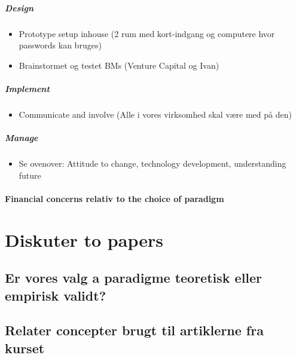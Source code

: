 \documentclass[a4paper]{article}
\begin{document}
\subparagraph{Design}
\begin{itemize}
\item Prototype setup inhouse (2 rum med kort-indgang og computere hvor passwords kan bruges)
\item Brainstormet og testet BMs (Venture Capital og Ivan)
\end{itemize}

\subparagraph{Implement}
\begin{itemize}
  \item Communicate and involve (Alle i vores virksomhed skal være med på den)
\end{itemize}

\subparagraph{Manage}
\begin{itemize}
  \item Se ovenover: Attitude to change, technology development, understanding future
\end{itemize}

\paragraph{Financial concerns relativ to the choice of paradigm}

\section{Diskuter to papers}
\subsection{Er vores valg a paradigme teoretisk eller empirisk validt?}
\subsection{Relater concepter brugt til artiklerne fra kurset}

\printbibliography[heading=bibintoc]
\end{document}
